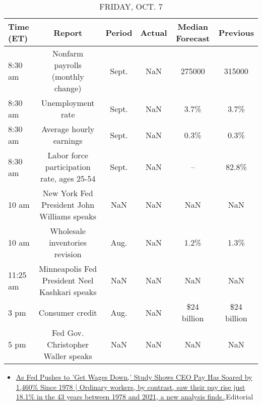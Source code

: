 \documentclass{article}%
\begin{document}
%


\begin{table}[htbp]%
\caption{FRIDAY, OCT. 7}%
\centering%
\begin{adjustbox}{width=1\textwidth}%
\begin{tabular}{lccccc}
\toprule
Time (ET) &                                         Report & Period & Actual & Median Forecast &    Previous \\
\midrule
  8:30 am &              Nonfarm payrolls (monthly change) &  Sept. &    NaN &          275000 &      315000 \\
  8:30 am &                              Unemployment rate &  Sept. &    NaN &            3.7\% &        3.7\% \\
  8:30 am &                        Average hourly earnings &  Sept. &    NaN &            0.3\% &        0.3\% \\
  8:30 am &     Labor force participation rate, ages 25-54 &  Sept. &    NaN &              -- &       82.8\% \\
    10 am &    New York Fed President John Williams speaks &    NaN &    NaN &             NaN &         NaN \\
    10 am &                 Wholesale inventories revision &   Aug. &    NaN &            1.2\% &        1.3\% \\
 11:25 am & Minneapolis Fed President Neel Kashkari speaks &    NaN &    NaN &             NaN &         NaN \\
     3 pm &                                Consumer credit &   Aug. &    NaN &     \$24 billion & \$24 billion \\
     5 pm &             Fed Gov. Christopher Waller speaks &    NaN &    NaN &             NaN &         NaN \\
\bottomrule
\end{tabular}
%
\end{adjustbox}%
\end{table}

%
\begin{itemize}%
\item%
\href{https://reddit.com/r/Economics/comments/xvelmf/as\_fed\_pushes\_to\_get\_wages\_down\_study\_shows\_ceo/}{As Fed Pushes to 'Get Wages Down,' Study Shows CEO Pay Has Soared by 1,460\% Since 1978 | Ordinary workers, by contrast, saw their pay rise just 18.1\% in the 43 years between 1978 and 2021, a new analysis finds.},Editorial%
\end{itemize}%
\end{document}
